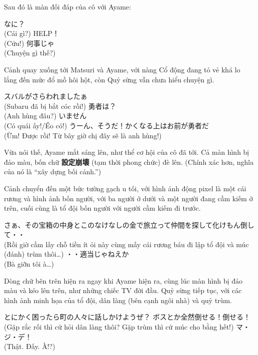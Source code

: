\documentclass[../main.tex]{subfiles}
\begin{document}
Sau đó là màn đối đáp của cô với Ayame:
\begin{dialogue}
   なに？ \\ (Cái gì?)
   HELP！ \\ (Cứu!)
   何事じゃ \\ (Chuyện gì thế?)
\end{dialogue}

Cảnh quay xuống tới Matsuri và Ayame, với nàng Cổ động đang tỏ vẻ khá lo lắng đến mức đổ mồ hôi hột, còn Quỷ sừng vẫn chưa hiểu chuyện gì.
\begin{dialogue}
   スバルがさらわれましたぁ \\ (Subaru đã bị bắt cóc rồi!)
   勇者は？ \\ (Anh hùng đâu?)
   いません \\ (Có quái ấy!/Éo có!)
   うーん、そうだ！かくなる上はお前が勇者だ \\ (Ừm! Được rồi! Từ bây giờ chị đây sẽ là anh hùng!)
\end{dialogue}


Vừa nói thế, Ayame mắt sáng lên, như thể cơ hội của cô đã tới. Cả màn hình bị đảo màu, bốn chữ \textbf{設定崩壊} (tạm thời phong chức) đè lên. (Chính xác hơn, nghĩa của nó là ``xây dựng bối cảnh.'')

Cảnh chuyển đến một bức tường gạch u tối, với hình ảnh động pixel là một cái rương và hình ảnh bốn người, với ba người ở dưới và một người đang cầm kiếm ở trên, cuối cùng là tổ đội bốn người với người cầm kiếm đi trước.
\begin{dialogue}
   さぁ、その宝箱の中身とこのなけなしの金で旅立って仲間を探して化けもん倒して・・ \\ (Rồi giờ cầm lấy chỗ tiền ít ỏi này cùng mấy cái rương báu đi lập tổ đội và múc (đánh) trùm thôi\dots)
   ・・適当じゃねえか \\ (Bà giỡn tôi à\dots)
\end{dialogue}

Dòng chữ bên trên hiện ra ngay khi Ayame hiện ra, cùng lúc màn hình bị đảo màu và kéo lên trên, như những chiếc TV đời đầu. Quỷ sừng tiếp tục, với các hình ảnh minh họa của tổ đội, dân làng (bên cạnh ngôi nhà) và quỷ trùm.
\begin{dialogue}
   とにかく困ったら町の人々に話しかけようぜ？ ボスとか全然倒せる！倒せる！ \\ (Gặp rắc rối thì cứ hỏi dân làng thôi? Gặp trùm thì cứ múc cho bằng hết!)
   マ・ジ・デ！ \\ (Thật. Đấy. À!?)
\end{dialogue}
\end{document}
